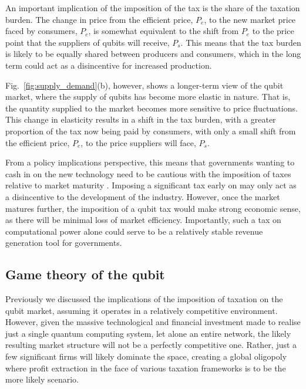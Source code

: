 An important implication of the imposition of the tax is the share of the taxation burden. The change in price from the efficient price, $P_e$, to the new market price faced by consumers, $P_c$, is somewhat equivalent to the shift from $P_e$ to the price point that the suppliers of qubits will receive, $P_s$. This means that the tax burden is likely to be equally shared between producers and consumers, which in the long term could act as a disincentive for increased production.

Fig.~\ref{fig:supply_demand}(b), however, shows a longer-term view of the qubit market, where the supply of qubits has become more elastic in nature. That is, the quantity supplied to the market becomes more sensitive to price fluctuations. This change in elasticity results in a shift in the tax burden, with a greater proportion of the tax now being paid by consumers, with only a small shift from the efficient price, $P_e$, to the price suppliers will face, $P_s$. 

From a policy implications perspective, this means that governments wanting to cash in on the new technology need to be cautious with the imposition of taxes relative to market maturity . Imposing a significant tax early on may only act as a disincentive to the development of the industry. However, once the market matures further, the imposition of a qubit tax would make strong economic sense, as there will be minimal loss of market efficiency. Importantly, such a tax on computational power alone could serve to be a relatively stable revenue generation tool for governments. 

%
%

\subsection{Game theory of the qubit}\label{sec:game_theory}

Previously we discussed the implications of the imposition of taxation on the qubit market, assuming it operates in a relatively competitive environment. However, given the massive technological and financial investment made to realise just a single quantum computing system, let alone an entire network, the likely resulting market structure will not be a perfectly competitive one. Rather, just a few significant firms will likely dominate the space, creating a global oligopoly where profit extraction in the face of various taxation frameworks is to be the more likely scenario. 

